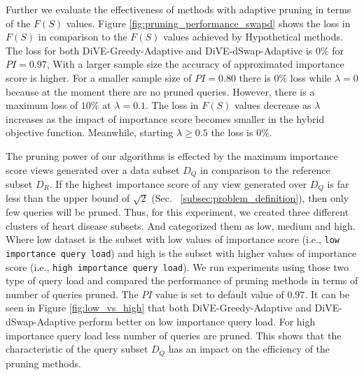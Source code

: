 Further we evaluate the effectiveness of methods with adaptive pruning in terms of the $F\left(S\right)$ values. 
Figure \ref{fig:pruning_performance_swapd} shows the loss in $F\left(S\right)$ in comparison to the $F\left(S\right)$ values achieved by Hypothetical methods. The loss for both DiVE-Greedy-Adaptive and DiVE-dSwap-Adaptive is $0\%$ for $PI=0.97$, With a larger sample size the accuracy of approximated importance score is higher. For a smaller sample size of $PI=0.80$ there is 0\% loss while $\lambda = 0$ because at the moment there are no pruned queries. However, there is a maximum loss of $10\%$ at $\lambda= 0.1$. The loss in $F\left(S\right)$ values decrease as $\lambda$ increases as the impact of importance score becomes smaller in the hybrid objective function. Meanwhile, starting $\lambda \geq 0.5$ the loss is 0\%.



{}
The pruning power of our algorithms is effected by the maximum importance score views generated over a data subset $D_Q$ in comparison to the reference subset $D_R$. If the highest importance score of any view generated over $D_Q$ is far less than the upper bound of $\sqrt{2}$ (Sec. ~\ref{subsec:problem_definition}), then only few queries will be pruned. 
%
%
Thus, for this experiment, we created three different clusters of heart disease subsets. And categorized them as low, medium and high. Where low dataset is the subset with low values of importance score (i.e., {\tt low importance query load}) and high is the subset with higher values of importance score (i.e., {\tt high importance query load}). We run experiments using those two type of query load and compared the performance of pruning methods in terms of number of queries pruned. The $ PI $ value is set to default value of $0.97$. It can be seen in Figure \ref{fig:low_vs_high} that both DiVE-Greedy-Adaptive and DiVE-dSwap-Adaptive perform better on low importance query load. For high importance query load less number of queries are pruned. This shows that the characteristic of the query subset $D_Q$ has an impact on the efficiency of the pruning methods.


